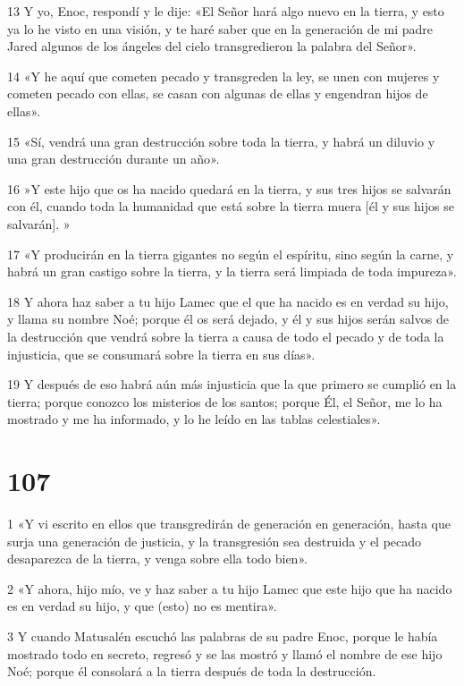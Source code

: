 \par 13 Y yo, Enoc, respondí y le dije: «El Señor hará algo nuevo en la tierra, y esto ya lo he visto en una visión, y te haré saber que en la generación de mi padre Jared algunos de los ángeles del cielo transgredieron la palabra del Señor».
\par 14 «Y he aquí que cometen pecado y transgreden la ley, se unen con mujeres y cometen pecado con ellas, se casan con algunas de ellas y engendran hijos de ellas».
\par 15 «Sí, vendrá una gran destrucción sobre toda la tierra, y habrá un diluvio y una gran destrucción durante un año».
\par 16 »Y este hijo que os ha nacido quedará en la tierra, y sus tres hijos se salvarán con él, cuando toda la humanidad que está sobre la tierra muera [él y sus hijos se salvarán]. »
\par 17 «Y producirán en la tierra gigantes no según el espíritu, sino según la carne, y habrá un gran castigo sobre la tierra, y la tierra será limpiada de toda impureza».
\par 18 Y ahora haz saber a tu hijo Lamec que el que ha nacido es en verdad su hijo, y llama su nombre Noé; porque él os será dejado, y él y sus hijos serán salvos de la destrucción que vendrá sobre la tierra a causa de todo el pecado y de toda la injusticia, que se consumará sobre la tierra en sus días».
\par 19 Y después de eso habrá aún más injusticia que la que primero se cumplió en la tierra; porque conozco los misterios de los santos; porque Él, el Señor, me lo ha mostrado y me ha informado, y lo he leído en las tablas celestiales».

\chapter{107}

\par 1 «Y vi escrito en ellos que transgredirán de generación en generación, hasta que surja una generación de justicia, y la transgresión sea destruida y el pecado desaparezca de la tierra, y venga sobre ella todo bien».
\par 2 «Y ahora, hijo mío, ve y haz saber a tu hijo Lamec que este hijo que ha nacido es en verdad su hijo, y que (esto) no es mentira».
\par 3 Y cuando Matusalén escuchó las palabras de su padre Enoc, porque le había mostrado todo en secreto, regresó y se las mostró y llamó el nombre de ese hijo Noé; porque él consolará a la tierra después de toda la destrucción.

